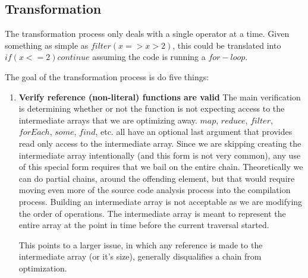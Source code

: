 \subsection{Transformation}\label{Transformation}

The transformation process only deals with a single operator at a time.  Given something as simple as $filter(x => x > 2)$, this could be translated into $if (x <= 2) continue$ assuming the code is running a $for-loop$.

The goal of the transformation process is do five things:
\begin{enumerate}
  \item \textbf{Verify reference (non-literal) functions are valid}
    The main verification is determining whether or not the function is not expecting access to the intermediate arrays that we are optimizing away.  $map$, $reduce$, $filter$, $forEach$, $some$, $find$, etc.  all have an optional last argument that provides read only access to the intermediate array.  Since we are skipping creating the intermediate array intentionally (and this form is not very common), \cite{TODO} %
    any use of this special form requires that we bail on the entire chain. Theoretically we can do partial chains, around the offending element, but that would require moving even more of the source code analysis process into the compilation process.  Building an intermediate array is not acceptable as we are modifying the order of operations.  The intermediate array is meant to represent the entire array at the point in time before the current traversal started.  

    This points to a larger issue, in which any reference is made to the intermediate array (or it's size), generally disqualifies a chain from optimization.
  

\end{enumerate}
